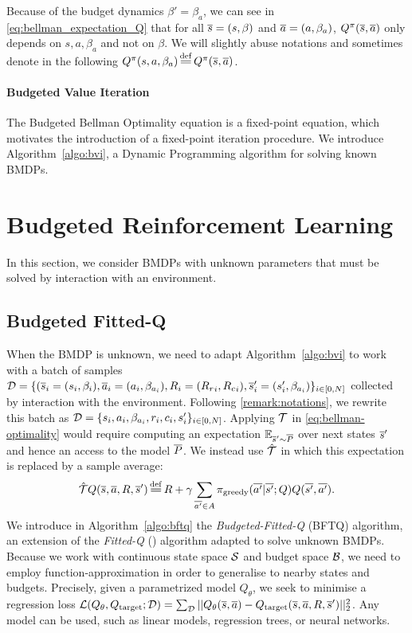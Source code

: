 \documentclass{article}
\begin{document}
\begin{remark}[Notations]
Because of the budget dynamics $\beta' = \beta_a$, we can see in \eqref{eq:bellman_expectation_Q} that for all $\overline{s}=(s, \beta)$ and $\overline{a}=(a, \beta_a)$, $Q^\pi(\overline{s}, \overline{a})$ only depends on $s, a, \beta_a$ and not on $\beta$. We will slightly abuse notations and sometimes denote in the following $Q^\pi(s, a, \beta_a) \eqdef Q^\pi(\os, \oa)$.
\label{remark:notations}
\end{remark}



\paragraph{Budgeted Value Iteration}

The Budgeted Bellman Optimality equation is a fixed-point equation, which motivates the introduction of a fixed-point iteration procedure. We introduce Algorithm~\ref{algo:bvi}, a Dynamic Programming algorithm for solving known BMDPs.

\section{Budgeted Reinforcement Learning}

In this section, we consider BMDPs with unknown parameters that must be solved by interaction with an environment. 

\subsection{Budgeted Fitted-Q}

When the BMDP is unknown, we need to adapt Algorithm~\ref{algo:bvi} to work with a batch of samples $\mathcal{D}=\{(\overline{s}_i=(s_i,\beta_i),\overline{a}_i=(a_i,\beta_{a_i}),R_i=({R_r}_i,{R_c}_i),\overline{s}_i'=(s_i',\beta_{a_i})\}_{i\in [0,N]}$ collected by interaction with the environment. Following \cref{remark:notations}, we rewrite this batch as  $\mathcal{D}=\{s_i,a_i,\beta_{a_i},r_i,c_i,s_i'\}_{i\in [0,N]}$. Applying $\mathcal{T}$ in \eqref{eq:bellman-optimality} would require computing an expectation $\operatorname*{\mathbb{E}}_{\overline{s}'\sim \overline{P}}$ over next states $\overline{s}'$ and hence an access to the model $\overline{P}$. We instead use $\hat{\mathcal{T}}$ in which this expectation is replaced by a sample average:
\begin{equation*}
    \hat{\cT} Q(\os, \oa, R, \os') \eqdef R + \gamma \sum_{\ov{a'}\in A} \pi_\text{greedy}(\ov{a'}|\ov{s'}; Q) Q(\ov{s'}, \ov{a'}).
\end{equation*}
We introduce in Algorithm~\ref{algo:bftq} the \emph{Budgeted-Fitted-Q} (BFTQ) algorithm, an extension of the \emph{Fitted-Q} (\FTQ) algorithm \citep{Ernst2005,Riedmiller2005} adapted to solve unknown BMDPs. Because we work with  continuous state space $\mathcal{S}$ and budget space $\mathcal{B}$, we need to employ function-approximation in order to generalise to nearby states and budgets. Precisely, given a parametrized model $Q_\theta$, we seek to minimise a regression loss $\mathcal{L}(Q_\theta, Q_\text{target};\mathcal{D}) = \sum_{\mathcal{D}} ||Q_\theta(\overline{s}, \overline{a}) - Q_\text{target}(\overline{s}, \overline{a}, R, \overline{s}')||_2^2$.
Any model can be used, such as linear models, regression trees, or neural networks.
\end{document}
